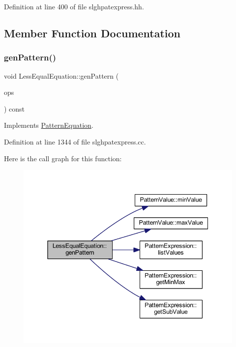 Definition at line 400 of file slghpatexpress.\+hh.



\subsection{Member Function Documentation}
\mbox{\label{class_less_equal_equation_ace9862ee9b24e31d3e07b76556f3e220}} 
\subsubsection{\texorpdfstring{genPattern()}{genPattern()}}
{\footnotesize\ttfamily void Less\+Equal\+Equation\+::gen\+Pattern (\begin{DoxyParamCaption}\item[{const vector$<$ \mbox{\hyperlink{class_token_pattern}{Token\+Pattern}} $>$ \&}]{ops }\end{DoxyParamCaption}) const\hspace{0.3cm}{\ttfamily [virtual]}}



Implements \mbox{\hyperlink{class_pattern_equation_a9838e5bfe5b6013c99567628a6364bfd}{Pattern\+Equation}}.



Definition at line 1344 of file slghpatexpress.\+cc.

Here is the call graph for this function\+:
\nopagebreak
\begin{figure}[H]
\begin{center}
\leavevmode
\includegraphics[width=345pt]{class_less_equal_equation_ace9862ee9b24e31d3e07b76556f3e220_cgraph}
\end{center}
\end{figure}


